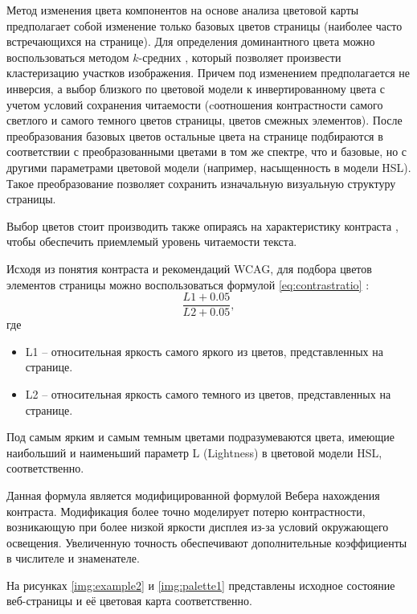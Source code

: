 Метод изменения цвета компонентов на основе анализа цветовой карты  предполагает собой изменение только базовых цветов страницы (наиболее часто встречающихся на странице). Для определения доминантного цвета можно воспользоваться методом $k$-средних \cite{kmeans}, который позволяет произвести кластеризацию участков изображения. Причем под изменением предполагается не инверсия, а выбор близкого по цветовой модели к инвертированному цвета с учетом условий сохранения читаемости \cite{wcag} (cоотношения контрастности самого светлого и самого темного цветов страницы, цветов смежных элементов). После преобразования базовых цветов остальные цвета на странице подбираются в соответствии с преобразованными цветами в том же спектре, что и базовые, но с другими параметрами цветовой модели (например, насыщенность в модели HSL). Такое преобразование позволяет сохранить изначальную визуальную структуру страницы.
 
Выбор цветов стоит производить также опираясь на характеристику контраста \cite{contrast}, чтобы обеспечить приемлемый уровень читаемости текста.

Исходя из понятия контраста и рекомендаций WCAG, для подбора цветов элементов страницы можно воспользоваться формулой  \ref{eq:contrastratio} \cite{wcagcontrast}:
\begin{equation}
	\label{eq:contrastratio}
	\frac{L1 + 0.05}{L2 + 0.05},
\end{equation}
где
\begin{itemize}
	\item L1 -- относительная яркость самого яркого из цветов, представленных на странице.
	\item L2 -- относительная яркость самого темного из цветов, представленных на странице.
\end{itemize}

Под самым ярким и самым темным цветами подразумеваются цвета, имеющие наибольший и наименьший параметр L (Lightness) в цветовой модели HSL, соответственно.

Данная формула является модифицированной формулой Вебера \cite{weber} нахождения контраста. Модификация более точно моделирует потерю контрастности, возникающую при более низкой яркости дисплея из-за условий окружающего освещения. Увеличенную точность обеспечивают дополнительные коэффициенты в числителе и знаменателе.

На рисунках \ref{img:example2} и \ref{img:palette1} представлены исходное состояние веб-страницы и её цветовая карта соответственно.

